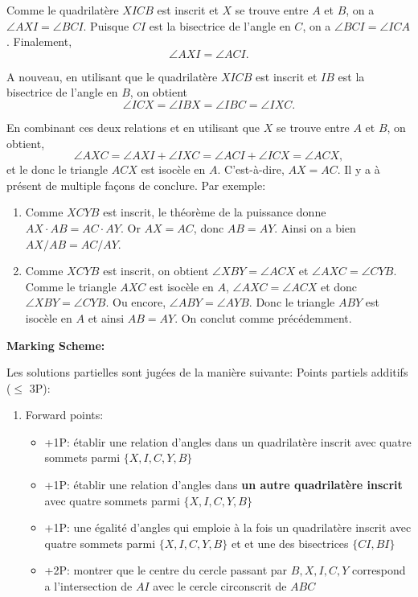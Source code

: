{Comme le quadrilatère $XICB$ est inscrit et $X$ se trouve entre $A$ et $B$, on a $\angle AXI=\angle BCI$. Puisque $CI$ est la bisectrice de l'angle en $C$, on a $\angle BCI=\angle ICA$. Finalement,
\[
\angle AXI=\angle ACI.
\]

A nouveau, en utilisant que le quadrilatère $XICB$ est inscrit et $IB$ est la bisectrice de l'angle en $B$, on obtient
\[
\angle ICX=\angle IBX=\angle IBC=\angle IXC.
\]

En combinant ces deux relations et en utilisant que $X$ se trouve entre $A$ et $B$, on obtient,
\[
\angle AXC=\angle AXI+\angle IXC=\angle ACI+\angle ICX=\angle ACX,
\]
et le donc le triangle $ACX$ est isocèle en $A$. C'est-à-dire, $AX=AC$. Il y a à présent de multiple façons de conclure. Par exemple:

\begin{enumerate}
    \item Comme $XCYB$ est inscrit, le théorème de la puissance donne $AX\cdot AB=AC\cdot AY$. Or $AX=AC$, donc $AB=AY$. Ainsi on a bien $AX/AB=AC/AY$.
    \item Comme $XCYB$ est inscrit, on obtient $\angle XBY=\angle ACX$ et $\angle AXC=\angle CYB$. Comme le triangle $AXC$ est isocèle en $A$, $\angle AXC=\angle ACX$ et donc $\angle XBY=\angle CYB$. Ou encore, $\angle ABY=\angle AYB$. Donc le triangle $ABY$ est isocèle en $A$ et ainsi $AB=AY$. On conclut comme précédemment.
\end{enumerate}

\textbf{Marking Scheme:}

Les solutions partielles sont jugées de la manière suivante:
Points partiels additifs ($\leq$ 3P):
\begin{enumerate}
    \item Forward points:

\begin{itemize}
    \item +1P: établir une relation d'angles dans un quadrilatère inscrit avec quatre sommets parmi $\{X,I,C,Y,B\}$
    \item +1P: établir une relation d'angles dans \textbf{un autre quadrilatère inscrit} avec quatre sommets parmi $\{X,I,C,Y,B\}$
    \item +1P: une égalité d'angles qui emploie à la fois un quadrilatère inscrit avec quatre sommets parmi $\{X,I,C,Y,B\}$ et et une des bisectrices $\{CI,BI\}$
    \item +2P: montrer que le centre du cercle passant par $B,X,I,C,Y$ correspond a l'intersection de $AI$ avec le cercle circonscrit de $ABC$
\end{itemize}


\end{enumerate}}

